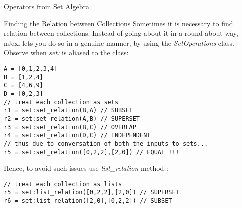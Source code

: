 \begin{section}{Operators from Set Algebra}
\begin{subsection}{Finding the Relation between Collections}
Sometimes it is necessary to find relation between collections.
Instead of going about it in a round about way, nJexl lets you do so
in a genuine manner, by using the \emph{SetOperations} class.
Observe when \emph{set:} is aliased to the class:
\begin{lstlisting}[style=JexlStyle]
A = [0,1,2,3,4]
B = [1,2,4]
C = [4,6,9]
D = [0,2,3]
// treat each collection as sets
r1 = set:set_relation(B,A) // SUBSET
r2 = set:set_relation(A,B) // SUPERSET
r3 = set:set_relation(B,C) // OVERLAP
r4 = set:set_relation(D,C) // INDEPENDENT
// thus due to conversation of both the inputs to sets...
r5 = set:set_relation([0,2,2],[2,0]) // EQUAL !!!
\end{lstlisting}
Hence, to avoid such issues use \emph{list\_relation} method :
\begin{lstlisting}[style=JexlStyle]
// treat each collection as lists
r5 = set:list_relation([0,2,2],[2,0]) // SUPERSET
r6 = set:list_relation([2,0],[0,2,2]) // SUBSET
\end{lstlisting}


\end{subsection}



\end{section}


